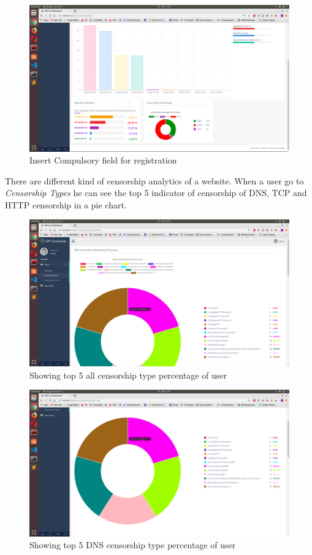 \begin{figure}[h]
    \centering
    \includegraphics[width=\textwidth]{website/3userhome2.png}
    \caption{Insert Compulsory field for registration}
    \label{fig:web5}
\end{figure}

There are different kind of censorship analytics of a website. When a user go to \emph{Censorship Types} he can see the top 5 indicator of censorship of DNS, TCP and HTTP censorship in a pie chart.

\begin{figure}[h]
    \centering
    \includegraphics[width=\textwidth]{website/4cens.png}
    \caption{Showing top 5 all censorship type percentage of user}
    \label{fig:web6}
\end{figure}

\begin{figure}[h]
    \centering
    \includegraphics[width=\textwidth]{website/5dns.png}
    \caption{Showing top 5 DNS censorship type percentage of user}
    \label{fig:web7}
\end{figure}

